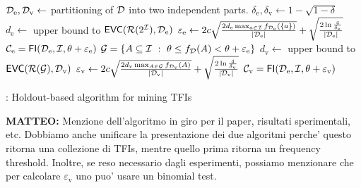 \begin{algorithm}[htbp]
   \DontPrintSemicolon
  ${\cal D}_\mathrm{e},{\cal D}_\mathrm{v}\leftarrow$ partitioning of ${\cal D}$ into two independent parts.\;
  $\delta_\mathrm{e},\delta_\mathrm{v}\leftarrow 1-\sqrt{1-\delta}$ 
  $d_\mathrm{e}\leftarrow$ upper bound to $\mathsf{EVC}(\mathcal{R}(2^{\cal I}),{\cal D}_\mathrm{e})$  
	$\varepsilon_\mathrm{e}\leftarrow
	2c\sqrt{\frac{2d_\mathrm{e}\max_{a\in{\cal I}}f_{{\cal D}_\mathrm{e}}(\{a\})}{|{\cal D}_\mathrm{e}|}}
	+ \sqrt{\frac{2\ln\frac{4}{\delta_\mathrm{e}}}{|{\cal D}_\mathrm{e}|}}$\;
  $\mathcal{C}_\mathrm{e}=\mathsf{FI}({\cal D}_\mathrm{e},{\cal I},\theta+\varepsilon_\mathrm{e})$\;
  $\mathcal{G}=\{A\subseteq{\cal I} ~:~ \theta\le f_{\cal D}(A)<\theta+\varepsilon_\mathrm{e}\}$\;
  $d_\mathrm{v}\leftarrow$ upper bound to $\mathsf{EVC}(\mathcal{R}(\mathcal{G}),{\cal D}_\mathrm{v})$  
	$\varepsilon_\mathrm{v}\leftarrow
	2c\sqrt{\frac{2d_\mathrm{v}\max_{A\in\mathcal{G}}f_{{\cal D}_\mathrm{v}}(A)}{|{\cal D}_\mathrm{v}|}}
	+ \sqrt{\frac{2\ln\frac{4}{\delta_\mathrm{v}}}{|{\cal D}_\mathrm{v}|}}$\;
  $\mathcal{C}_\mathrm{v}=\mathsf{FI}({\cal D}_\mathrm{e},{\cal I},\theta+\varepsilon_\mathrm{v})$\;
  \caption{\ALGHOLDOUT: Holdout-based algorithm for mining TFIs}
  \label{alg:holdout}
\end{algorithm}

{\bf MATTEO:} Menzione dell'algoritmo in giro per il paper, risultati
sperimentali, etc. Dobbiamo anche unificare la presentazione dei due algoritmi
perche' questo ritorna una collezione di TFIs, mentre quello prima ritorna un
frequency threshold. Inoltre, se reso necessario dagli esperimenti, possiamo
menzionare che per calcolare $\varepsilon_\mathrm{v}$ uno puo' usare un binomial
test.
